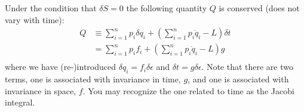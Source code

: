 %
Under the condition that $\delta S=0$ the following quantity $Q$ is conserved (does not vary with time):
\begin{align}
Q&\equiv\sum_{i=1}^np_i\delta q_i +\left(\sum_{i=1}^n p_i\dot{q}_i-L\right)\delta t\nonumber\\
&=\sum_{i=1}^n p_if_i +\left(\sum_{i=1}^n p_i\dot{q}_i-L\right)g\nonumber\\
\end{align}
where we have (re-)introduced $\delta q_i=f_i\delta\epsilon$ and $\delta t=g\delta\epsilon$. Note that there are two terms, one is associated with invariance in time, $g$, and one is associated with invariance in space, $f$. You may recognize the one related to time as the Jacobi integral.

